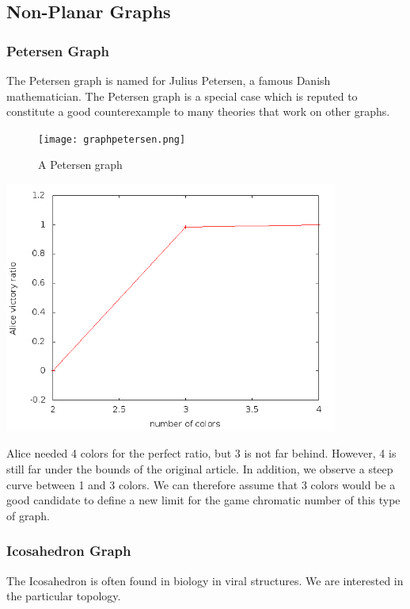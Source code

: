 \subsection{Non-Planar Graphs}

\subsubsection{Petersen Graph}

The Petersen graph is named for Julius Petersen, a famous Danish mathematician. The Petersen graph is a special case which is reputed to constitute a good counterexample to many theories that work on other graphs.

\begin{figure}[h]
\begin{center}  
	\texttt{[image: graphpetersen.png]}
\end{center}
    \caption{A Petersen graph}
    \label{petersengraph}
\end{figure}

\includegraphics[width=11cm]{resultats/petersen.png}

Alice needed 4 colors for the perfect ratio, but 3 is not far behind. However, 4 is still far under the bounds of the original article. In addition, we observe a steep curve between 1 and 3 colors. We can therefore assume that 3 colors would be a good candidate to define a new limit for the game chromatic number of this type of graph.

\subsubsection{Icosahedron Graph}

The Icosahedron is often found in biology in viral structures. We are interested in the particular topology.

